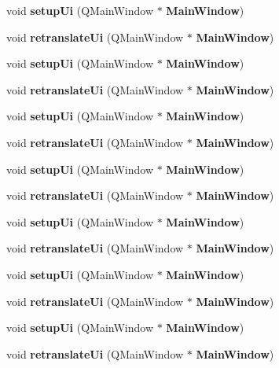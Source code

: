 \begin{DoxyCompactItemize}
\item 
\mbox{\label{class_ui___main_window_acf4a0872c4c77d8f43a2ec66ed849b58}} 
void {\bfseries setup\+Ui} (Q\+Main\+Window $\ast$\textbf{ Main\+Window})
\item 
\mbox{\label{class_ui___main_window_a097dd160c3534a204904cb374412c618}} 
void {\bfseries retranslate\+Ui} (Q\+Main\+Window $\ast$\textbf{ Main\+Window})
\item 
\mbox{\label{class_ui___main_window_acf4a0872c4c77d8f43a2ec66ed849b58}} 
void {\bfseries setup\+Ui} (Q\+Main\+Window $\ast$\textbf{ Main\+Window})
\item 
\mbox{\label{class_ui___main_window_a097dd160c3534a204904cb374412c618}} 
void {\bfseries retranslate\+Ui} (Q\+Main\+Window $\ast$\textbf{ Main\+Window})
\item 
\mbox{\label{class_ui___main_window_acf4a0872c4c77d8f43a2ec66ed849b58}} 
void {\bfseries setup\+Ui} (Q\+Main\+Window $\ast$\textbf{ Main\+Window})
\item 
\mbox{\label{class_ui___main_window_a097dd160c3534a204904cb374412c618}} 
void {\bfseries retranslate\+Ui} (Q\+Main\+Window $\ast$\textbf{ Main\+Window})
\item 
\mbox{\label{class_ui___main_window_acf4a0872c4c77d8f43a2ec66ed849b58}} 
void {\bfseries setup\+Ui} (Q\+Main\+Window $\ast$\textbf{ Main\+Window})
\item 
\mbox{\label{class_ui___main_window_a097dd160c3534a204904cb374412c618}} 
void {\bfseries retranslate\+Ui} (Q\+Main\+Window $\ast$\textbf{ Main\+Window})
\item 
\mbox{\label{class_ui___main_window_acf4a0872c4c77d8f43a2ec66ed849b58}} 
void {\bfseries setup\+Ui} (Q\+Main\+Window $\ast$\textbf{ Main\+Window})
\item 
\mbox{\label{class_ui___main_window_a097dd160c3534a204904cb374412c618}} 
void {\bfseries retranslate\+Ui} (Q\+Main\+Window $\ast$\textbf{ Main\+Window})
\item 
\mbox{\label{class_ui___main_window_acf4a0872c4c77d8f43a2ec66ed849b58}} 
void {\bfseries setup\+Ui} (Q\+Main\+Window $\ast$\textbf{ Main\+Window})
\item 
\mbox{\label{class_ui___main_window_a097dd160c3534a204904cb374412c618}} 
void {\bfseries retranslate\+Ui} (Q\+Main\+Window $\ast$\textbf{ Main\+Window})
\item 
\mbox{\label{class_ui___main_window_acf4a0872c4c77d8f43a2ec66ed849b58}} 
void {\bfseries setup\+Ui} (Q\+Main\+Window $\ast$\textbf{ Main\+Window})
\item 
\mbox{\label{class_ui___main_window_a097dd160c3534a204904cb374412c618}} 
void {\bfseries retranslate\+Ui} (Q\+Main\+Window $\ast$\textbf{ Main\+Window})
\end{DoxyCompactItemize}
